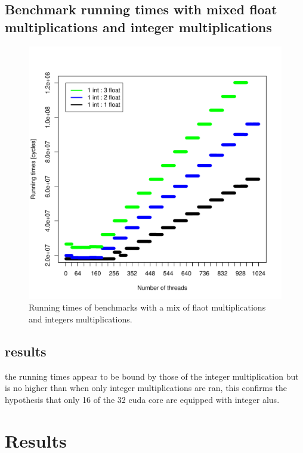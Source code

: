 \documentclass{report}
\def \scalingfactor{.8}
\begin{document}
	\subsection{Benchmark running times with mixed float multiplications and integer multiplications}
	\begin{figure}[H]
		\centering
		\vspace{-20pt}
        \includegraphics[width=\scalingfactor\linewidth]{"graphics/running_times_mixed"}
		\vspace{-15pt}
		\captionsetup{justification=centering}
        \caption{Running times of benchmarks with a mix of flaot multiplications and integers multiplications.}
    \end{figure}

    \subsection{results}
    the running times appear to be bound by those of the integer multiplication but is no higher than
    when only integer multiplications are ran, this confirms the hypothesis that only 16 of the 32
    cuda core are equipped with integer alus. 

\section{Results}
\end{document}
